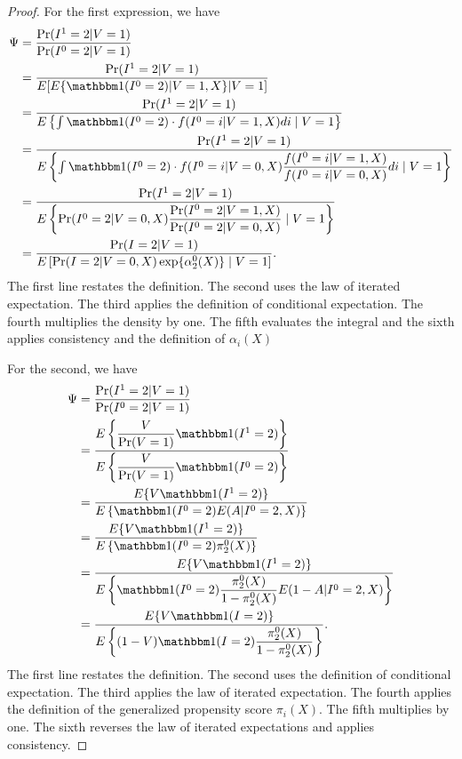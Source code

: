 \documentclass{article}
\begin{document}
\begin{proof}
For the first expression, we have 
\begin{align*}
    \Psi &= \dfrac{\Pr(I^1=2|V=1)}{\Pr(I^0=2|V=1)} \\
    &= \dfrac{\Pr(I^1=2|V=1)}{E[E\{\mathbbm 1 (I^0 = 2) | V = 1, X\} | V = 1]} \\
    &= \dfrac{\Pr(I^1=2|V=1)}{E\left\{\int \mathbbm 1 (I^0 = 2) \cdot f(I^0 = i | V = 1, X) di \mid  V = 1\right\}} \\
    &= \dfrac{\Pr(I^1=2|V=1)}{E\left\{\int \mathbbm 1 (I^0 = 2) \cdot f(I^0 = i | V = 0, X) \dfrac{f(I^0 = i | V = 1, X)}{f(I^0 = i | V = 0, X)}di \mid  V = 1\right\}} \\
    &= \dfrac{\Pr(I^1=2|V=1)}{E\left\{ \Pr(I^0 = 2 | V = 0, X) \dfrac{\Pr(I^0 = 2 | V = 1, X)}{\Pr(I^0 = 2 | V = 0, X)} \mid  V = 1\right\}} \\
    &= \dfrac{\Pr(I=2|V=1)}{E\left[ \Pr(I = 2 | V = 0, X) \exp\{\alpha^0_2(X)\} \mid  V = 1\right]}.
\end{align*}
The first line restates the definition. The second uses the law of iterated expectation. The third applies the definition of conditional expectation. The fourth multiplies the density by one. The fifth evaluates the integral and the sixth applies consistency and the definition of $\alpha_i(X)$

For the second, we have 
\begin{align*}
    \Psi &= \dfrac{\Pr(I^1=2|V=1)}{\Pr(I^0=2|V=1)} \\
    &= \dfrac{E\left\{\dfrac{V}{\Pr(V = 1)} \mathbbm 1 (I^1 = 2)\right\}}{E\left\{\dfrac{V}{\Pr(V=1)}\mathbbm 1 (I^0 = 2)\right\}} \\
    &= \dfrac{E\{V \mathbbm 1 (I^1 = 2)\}}{E\left\{\mathbbm 1 (I^0 = 2) E(A | I^0 = 2, X)\right\}} \\
    &= \dfrac{E\{V \mathbbm 1 (I^1 = 2)\}}{E\left\{\mathbbm 1 (I^0 = 2) \pi^0_2(X)\right\}} \\
    &= \dfrac{E\{V \mathbbm 1 (I^1 = 2)\}}{E\left\{\mathbbm 1 (I^0 = 2) \dfrac{\pi^0_2(X)}{1-\pi^0_2(X)}E(1-A|I^0 = 2, X)\right\}} \\
    &= \dfrac{E\{V \mathbbm 1 (I = 2)\}}{E\left\{(1 - V)\mathbbm 1 (I = 2) \dfrac{\pi^0_2(X)}{1-\pi^0_2(X)}\right\}}.
\end{align*}
The first line restates the definition. The second uses the definition of conditional expectation. The third applies the law of iterated expectation. The fourth applies the definition of the generalized propensity score $\pi_i(X)$. The fifth multiplies by one. The sixth reverses the law of iterated expectations and applies consistency. 
\end{proof}
\newpage
\end{document}
